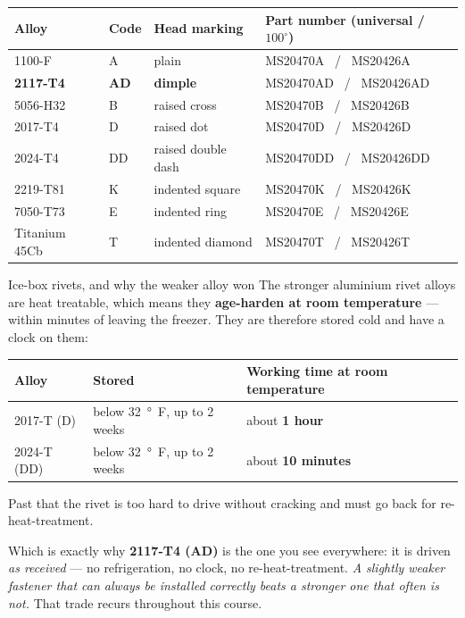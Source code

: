 \documentclass[11pt,a4paper]{article}
\begin{document}
\begin{center}\footnotesize
\begin{tabular}{@{}llll@{}}
\toprule
Alloy & Code & Head marking & Part number (universal / $100^\circ$)\\
\midrule
1100-F & A & plain & MS20470A \ / \ MS20426A\\
\textbf{2117-T4} & \textbf{AD} & \textbf{dimple} & MS20470AD \ / \ MS20426AD\\
5056-H32 & B & raised cross & MS20470B \ / \ MS20426B\\
2017-T4 & D & raised dot & MS20470D \ / \ MS20426D\\
2024-T4 & DD & raised double dash & MS20470DD \ / \ MS20426DD\\
2219-T81 & K & indented square & MS20470K \ / \ MS20426K\\
7050-T73 & E & indented ring & MS20470E \ / \ MS20426E\\
Titanium 45Cb & T & indented diamond & MS20470T \ / \ MS20426T\\
\bottomrule
\end{tabular}
\end{center}

\begin{aerobox}{Ice-box rivets, and why the weaker alloy won}
The stronger aluminium rivet alloys are heat treatable, which means they \textbf{age-harden at room
temperature} --- within minutes of leaving the freezer. They are therefore stored cold and have a
clock on them:

\medskip
\begin{center}\small
\begin{tabular}{@{}lll@{}}
\toprule
Alloy & Stored & Working time at room temperature\\
\midrule
2017-T (D) & below \SI{32}{\degree F}, up to 2 weeks & about \textbf{1 hour}\\
2024-T (DD) & below \SI{32}{\degree F}, up to 2 weeks & about \textbf{10 minutes}\\
\bottomrule
\end{tabular}
\end{center}

\medskip
Past that the rivet is too hard to drive without cracking and must go back for re-heat-treatment.

\medskip
Which is exactly why \textbf{2117-T4 (AD)} is the one you see everywhere: it is driven \emph{as
received} --- no refrigeration, no clock, no re-heat-treatment. \emph{A slightly weaker fastener
that can always be installed correctly beats a stronger one that often is not.} That trade recurs
throughout this course.
\end{aerobox}
\end{document}
